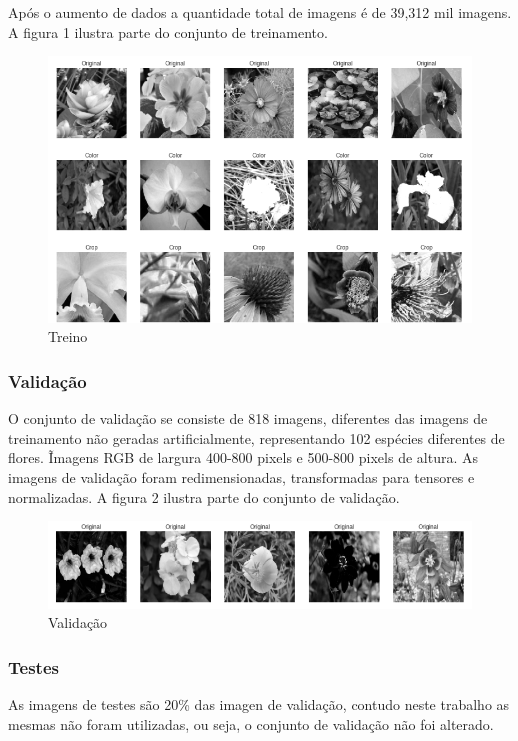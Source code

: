 \documentclass[12pt]{article}
\newcommand\tab[1][1cm]{\hspace*{#1}}
\begin{document}
Após o aumento de dados a quantidade total de imagens é de 39,312 mil imagens. A figura 1 ilustra parte do conjunto de treinamento.

\begin{figure}[ht]
\centering
\includegraphics[width=.9\textwidth]{train.png}
\caption{Treino}
\label{fig:train}
\end{figure}

\subsubsection{Validação}

\tab\tab[0.5pt] O conjunto de validação se consiste de 818 imagens, diferentes das imagens de treinamento não geradas artificialmente, representando 102 espécies diferentes de flores. Ĩmagens RGB de largura 400-800 pixels e 500-800 pixels de altura. As imagens de validação foram redimensionadas, transformadas para tensores e normalizadas. A figura 2 ilustra parte do conjunto de validação.

\begin{figure}[ht]
\centering
\includegraphics[width=.9\textwidth]{valid.png}
\caption{Validação}
\label{fig:valid}
\end{figure}

\subsubsection{Testes}

\tab\tab[0.5pt] As imagens de testes são 20\% das imagen de validação, contudo neste trabalho as mesmas não foram utilizadas, ou seja, o conjunto de validação não foi alterado.
\end{document}
